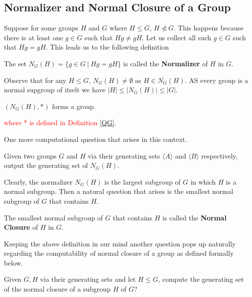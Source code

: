 \subsection{Normalizer and Normal Closure of a Group}
Suppose for some groups $H$ and $G$ where $H\leq G$, $H\ntriangleleft G$. This happens because there is at least one $g\in G$ such that $Hg\neq gH$. 
Let us collect all such $g\in G$ such that $Hg = gH$. This leads us to the following definition 
\begin{definition}\label{normalizer}
	The set $N_G(H) = \{g\in G~|~Hg = gH\}$ is called the {\bf Normalizer} of $H$ in $G$.
\end{definition}
Observe that for any $H\leq G$, $N_G(H) \neq \emptyset$ as $H\in N_G(H)$. AS every group is a normal supgroup of itselt we have $|H|\leq |N_G(H)| \leq |G|$.

\begin{observation}
 $(N_G(H),*)$ forms a group. 
\end{observation}
 
 \textcolor{red}{
where * is defined in Definition \ref{QG}}. 
 
 One more computational question that arises in this context.
\begin{problem}\label{3}
	Given two groups $G$ and $H$ via their generating sets $\langle A\rangle$ and $\langle B\rangle$ respectively, output the generating set of $N_G(H)$.
\end{problem}
Clearly, the normalizer $N_G(H)$ is the largest subgroup of $G$ in which $H$ is a normal subgroup. Then a natural question that arises is the smallest normal subgroup of $G$ that contains $H$. 
\begin{definition}
The smallest normal subgroup of $G$ that contains $H$ is called the {\bf Normal Closure} of $H$ in $G$.
\end{definition}
Keeping the above definition in our mind another question pops up naturally regarding the computability of normal closure of a group as defined formally below.
\begin{exercise}
	Given $G,H$ via their generating sets and let $H\leq G$, compute the generating set of the normal closure of a subgroup $H$ of $G$? 
\end{exercise}


